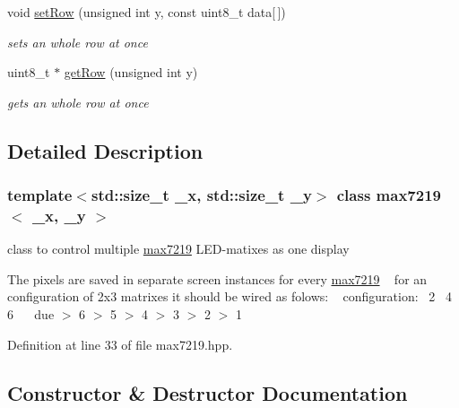 \begin{DoxyCompactItemize}
void \mbox{\hyperlink{classmax7219_ad77f11c4362f850ea2ea56816ac9a784}{set\+Row}} (unsigned int y, const uint8\+\_\+t data\mbox{[}$\,$\mbox{]})
\begin{DoxyCompactList}\small\item\em sets an whole row at once \end{DoxyCompactList}\item 
uint8\+\_\+t $\ast$ \mbox{\hyperlink{classmax7219_ada812c3eed0a655300d2f3914910f103}{get\+Row}} (unsigned int y)
\begin{DoxyCompactList}\small\item\em gets an whole row at once \end{DoxyCompactList}\end{DoxyCompactItemize}


\subsection{Detailed Description}
\subsubsection*{template$<$std\+::size\+\_\+t \+\_\+x, std\+::size\+\_\+t \+\_\+y$>$\newline
class max7219$<$ \+\_\+x, \+\_\+y $>$}

class to control multiple \mbox{\hyperlink{classmax7219}{max7219}} L\+E\+D-\/matixes as one display 

The pixels are saved in separate screen instances for every \mbox{\hyperlink{classmax7219}{max7219}} ~\newline
for an configuration of 2x3 matrixes it should be wired as folows\+: ~\newline
configuration\+:~ 2~ 4~ 6~\newline
~\newline
due $>$ 6 $>$ 5 $>$ 4 $>$ 3 $>$ 2 $>$ 1 

Definition at line 33 of file max7219.\+hpp.



\subsection{Constructor \& Destructor Documentation}
\mbox{\label{classmax7219_aa0ed4b1bcde10c1d92c90337f9a54540}} 
